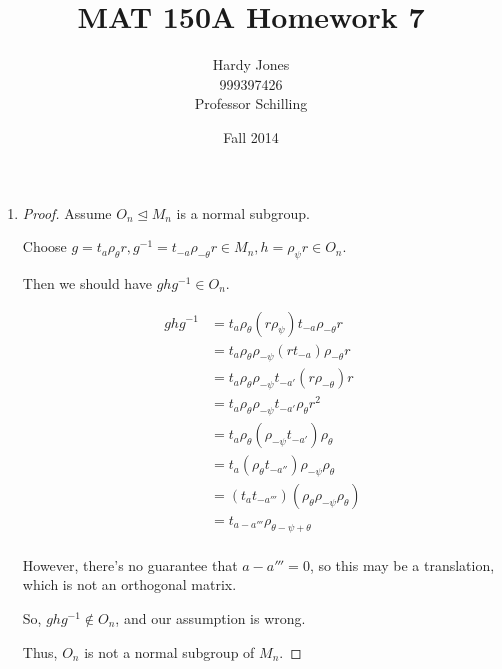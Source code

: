 \documentclass[12pt,letterpaper]{article}
\title{MAT 150A Homework 7\vspace{-2ex}}
\author{Hardy Jones\\
        999397426\\
        Professor Schilling\vspace{-2ex}}
\date{Fall 2014}
\newcommand{\ghg}[1]{g#1g^{-1}}
\begin{document}
  \maketitle

  \begin{enumerate}
    \item
      \begin{proof}
        Assume $O_n \trianglelefteq M_n$ is a normal subgroup.

        Choose $g = t_a \rho_\theta r, g^{-1} = t_{-a} \rho_{-\theta} r \in M_n, h = \rho_\psi r \in O_n$.

        Then we should have $\ghg{h} \in O_n$.

        \begin{align*}
          \ghg{h} &= t_a \rho_\theta (r \rho_\psi) t_{-a} \rho_{-\theta} r \\
          &= t_a \rho_\theta \rho_{-\psi} (r t_{-a}) \rho_{-\theta} r \\
          &= t_a \rho_\theta \rho_{-\psi} t_{-a'} (r \rho_{-\theta}) r \\
          &= t_a \rho_\theta \rho_{-\psi} t_{-a'} \rho_\theta r^2 \\
          &= t_a \rho_\theta (\rho_{-\psi} t_{-a'}) \rho_\theta \\
          &= t_a (\rho_\theta t_{-a''}) \rho_{-\psi} \rho_\theta \\
          &= (t_a t_{-a'''}) (\rho_\theta \rho_{-\psi} \rho_\theta) \\
          &= t_{a - a'''} \rho_{\theta - \psi + \theta} \\
        \end{align*}

        However, there's no guarantee that $a - a''' = 0$,
        so this may be a translation, which is not an orthogonal matrix.

        So, $\ghg{h} \notin O_n$, and our assumption is wrong.

        Thus,  $O_n$ is not a normal subgroup of $M_n$.
      \end{proof}


\end{enumerate}
\end{document}
